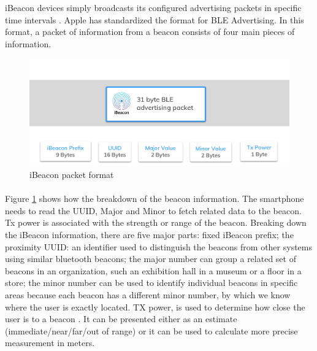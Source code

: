 \documentclass[12pt]{article}
\begin{document}
iBeacon devices simply broadcasts its configured advertising packets in specific time intervals \cite{one}. Apple has standardized the format for BLE Advertising. In this format, a packet of information from a beacon consists of four main pieces of information. \\


\begin{figure}[H]
	\centering
	\includegraphics[width=1.0\linewidth]{media/ibeacon-format.jpg}
	\caption{iBeacon packet format}
	\label{fig:iBPacket}
\end{figure} 

\paragraph{}Figure \ref{fig:iBPacket} shows how the breakdown of the beacon information. The smartphone needs to read the UUID, Major and Minor to fetch related data to the beacon. Tx power is associated with the strength or range of the beacon. Breaking down the iBeacon information, there are five major parts: fixed iBeacon prefix; the proximity UUID: an identifier used to distinguish the beacons from other systems using similar bluetooth beacons; the major number can group a related set of beacons in an organization, such an exhibition hall in a museum or a floor in a store; the minor number can be used to identify individual beacons in specific areas because each beacon has a different minor number, by which we know where the user is exactly located. TX power, is used to determine how close the user is to a beacon \cite{beacons}. It can be presented either as an estimate (immediate/near/far/out of range) or it can be used to calculate more precise measurement in meters.
%
\end{document}
